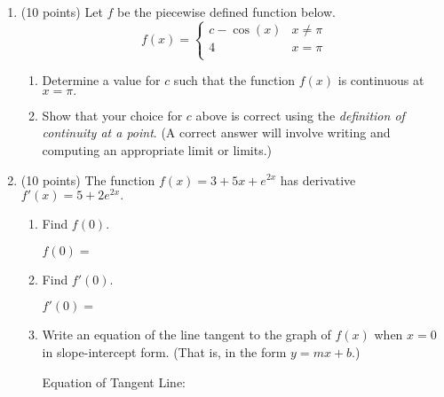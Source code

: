 \documentclass[11pt]{article}
\begin{document}
\begin{enumerate}
\newpage
\item (10 points) Let $f$ be the piecewise defined function below.
$$f(x)=\begin{cases} c-\cos (x) & x \not= \pi \\ 4 & x=\pi \\
\end{cases}$$
\begin{enumerate}
	\item Determine a value for $c$ such that the function $f(x)$ is continuous at $x=\pi.$
\vfill

	\item Show that your choice for $c$ above is correct using the \emph{definition of continuity at a point}. (A correct answer will involve writing and computing an appropriate limit or limits.)
\vfill
\vfill
\vfill

\end{enumerate}

\item (10 points) The function $f(x)=3+5x+e^{2x}$ has derivative $f'(x)=5+2e^{2x}.$ 
\begin{enumerate}
\item Find $f(0).$ 

\vfill
\hfill $f(0) = $ \ans %

\bigskip

\item Find $f'(0).$ 
\vfill


\hfill $f'(0) = $ \ans %

\bigskip

\item Write an equation of the line tangent to the graph of $f(x)$ when $x=0$ in slope-intercept form. (That is, in the form $y=mx+b$.) 
\vfill

\hfill Equation of Tangent Line: \ans\ans\ans%

\bigskip

\end{enumerate}
\newpage

%
%
%
%
%
%
%
%



\end{enumerate}
\end{document}
